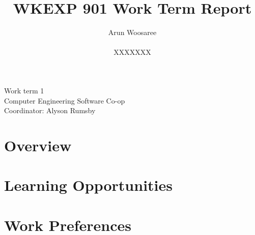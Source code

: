 \documentclass[letterpaper,12pt]{article}
\title{WKEXP 901 Work Term Report}
\author{Arun Woosaree \\ \\  XXXXXXX}
\begin{document}
\begin{titlepage}
\maketitle
\thispagestyle{empty}
\centering
\large
\vspace{1cm}
Work term 1\\
\vspace{1cm}
Computer Engineering Software Co-op \\
\vspace{1cm}
Coordinator: Alyson Rumsby
\end{titlepage}

\section{Overview}
\lipsum[0-4]

\section{Learning Opportunities}
\lipsum[5-9]

\section{Work Preferences}
\lipsum[10-14]


\nocite{atbwebsite}

\end{document}
